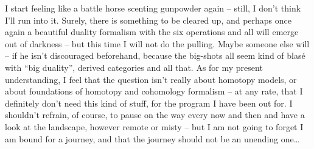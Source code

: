 I start feeling like a battle horse scenting gunpowder again -- still,
I don't think I'll run into it. Surely, there is something to be
cleared up, and perhaps once again a beautiful duality formalism with
the six operations and all will emerge out of darkness -- but this
time I will not do the pulling. Maybe someone else will -- if he isn't
discouraged beforehand, because the big-shots all seem kind of blasé
with ``big duality'', derived categories and all that. As for my
present understanding, I feel that the question isn't really about
homotopy models, or about foundations of homotopy and cohomology
formalism -- at any rate, that I definitely don't need this kind of
stuff, for the program I have been out for. I shouldn't refrain, of
course, to pause on the way every now and then and have a look at the
landscape, however remote or misty -- but I am not going to forget I
am bound for a journey, and that the journey should not be an unending
one\dots

\bigbreak

\presectionfill{}\par

